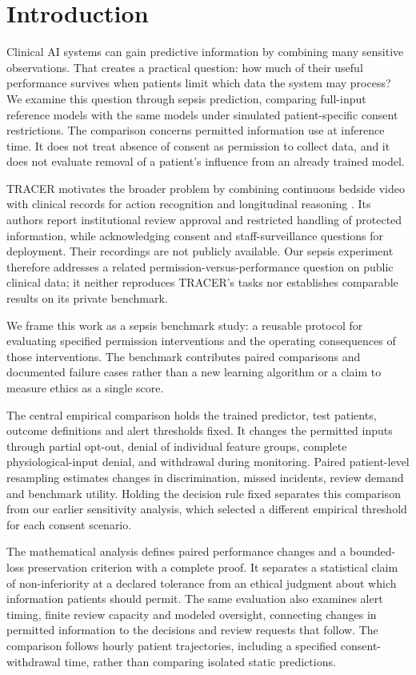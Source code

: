 \section*{Introduction}
Clinical AI systems can gain predictive information by combining many sensitive observations. That creates a practical question: how much of their useful performance survives when patients limit which data the system may process? We examine this question through sepsis prediction, comparing full-input reference models with the same models under simulated patient-specific consent restrictions. The comparison concerns permitted information use at inference time. It does not treat absence of consent as permission to collect data, and it does not evaluate removal of a patient's influence from an already trained model.

TRACER motivates the broader problem by combining continuous bedside video with clinical records for action recognition and longitudinal reasoning \citep{tracer}. Its authors report institutional review approval and restricted handling of protected information, while acknowledging consent and staff-surveillance questions for deployment. Their recordings are not publicly available. Our sepsis experiment therefore addresses a related permission-versus-performance question on public clinical data; it neither reproduces TRACER's tasks nor establishes comparable results on its private benchmark.

We frame this work as a sepsis benchmark study: a reusable protocol for evaluating specified permission interventions and the operating consequences of those interventions. The benchmark contributes paired comparisons and documented failure cases rather than a new learning algorithm or a claim to measure ethics as a single score.

The central empirical comparison holds the trained predictor, test patients, outcome definitions and alert thresholds fixed. It changes the permitted inputs through partial opt-out, denial of individual feature groups, complete physiological-input denial, and withdrawal during monitoring. Paired patient-level resampling estimates changes in discrimination, missed incidents, review demand and benchmark utility. Holding the decision rule fixed separates this comparison from our earlier sensitivity analysis, which selected a different empirical threshold for each consent scenario.

The mathematical analysis defines paired performance changes and a bounded-loss preservation criterion with a complete proof. It separates a statistical claim of non-inferiority at a declared tolerance from an ethical judgment about which information patients should permit. The same evaluation also examines alert timing, finite review capacity and modeled oversight, connecting changes in permitted information to the decisions and review requests that follow. The comparison follows hourly patient trajectories, including a specified consent-withdrawal time, rather than comparing isolated static predictions.

